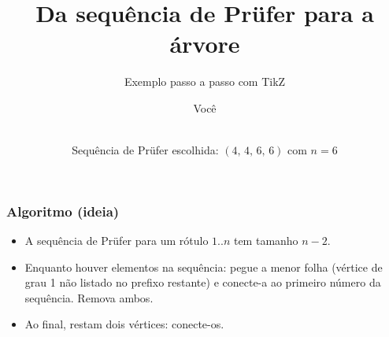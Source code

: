 \documentclass[aspectratio=169]{beamer}
\title{Da sequência de Prüfer para a árvore}
\subtitle{Exemplo passo a passo com TikZ}
\author{Você}
\date{\\Sequência de Prüfer escolhida: \( (4,\,4,\,6,\,6) \) com \(n=6\)}
\begin{document}
\begin{frame}
  \titlepage
\end{frame}

\newcommand{\VertexLayout}{%
  \node[vtx] (4) at (0,0) {4};
  \node[vtx] (1) at (-1.5,1.5) {1};
  \node[vtx] (2) at (-1.5,-1.5) {2};
  \node[vtx] (6) at (2,0) {6};
  \node[vtx] (3) at (3.5,1) {3};
  \node[vtx] (5) at (3.5,-1) {5};
}

\newcommand{\SidePanel}[2]{%
  \begin{minipage}[t]{0.38\linewidth}
    \small
    \textbf{Sequência restante:}\\[2pt]
    {\Large\color{seq} #1}\\[6pt]
    \textbf{Menor folha disponível:}\\[2pt]
    {\large\color{leaf} #2}
  \end{minipage}%
}

\begin{frame}[t]
  \frametitle{Algoritmo (ideia)}
  \begin{itemize}
    \item A sequência de Prüfer para um rótulo \(1..n\) tem tamanho \(n-2\).
    \item Enquanto houver elementos na sequência: pegue a \alert{menor folha} (vértice de grau 1 não listado no prefixo restante) e conecte-a ao \alert{primeiro} número da sequência. Remova ambos.
    \item Ao final, restam dois vértices: conecte-os.
  \end{itemize}
\end{frame}
\end{document}
